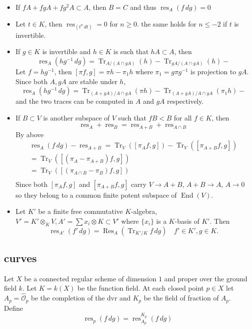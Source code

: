 \documentclass[leqno]{amsart}
\DeclareMathOperator{\Tr}{Tr}
\DeclareMathOperator{\mtr}{Tr}
\newcommand{\oo}{\mathcal O}
\newcommand{\1}{\mathbf{1}}
\DeclareMathOperator{\End}{End}
\DeclareMathOperator{\Res}{Res}
\DeclareMathOperator{\res}{res}
\theoremstyle{definition}
\theoremstyle{remark}
\begin{document}
\begin{itemize}
	\item 
	 If $fA+fgA+fg^2A\subset A$,
	 then  $B=C$ and
	 thus  $\res_A(f\,dg)=0$
 \item Let $t\in K$, then  $\res_(t^n\,dt)=0$
	 for  $n\geq 0$.
	 the same holds for  $n\leq -2$
	 if  $t$ is invertible.
 \item If  $g\in K$ is invertible and  $h\in K$
	 is such that  $hA\subset A$, then
	  \[
		  \res_A(hg^{-1}\,dg)=
		  \mtr_{A/(A\cap gA)}(h)-
		  \mtr_{gA/(A\cap gA)}(h)-
	 \]
	 Let $f=hg^{-1}$, then
	 $[\pi f, g]=\pi h-\pi_1h$ 
	 where $\pi_1=g\pi g^{-1}$ is projection to  $gA$.
	 Since  both $A,gA$ are stable under  $h$,
	  \[
		  \res_A(hg^{-1}\,dg)=
		  \mtr_{(A+gA)/A\cap gA}(\pi h)-
		  \mtr_{(A+gA)/A\cap gA}(\pi_1 h)-
	 \]
	 and the two traces can be computed in $A$ and  $gA$
	 respectively.
 \item If $B\subset V$ is another subspace of  $V$
	 such that  $fB<B$ for all  $f\in K$, then
	  \[
	  	\res_A+\res_B=\res_{A+B}+\res_{A\cap B}
	  \]
	  By above
	  \begin{multline*}
		  \res_A(f\,dg)-\res_{A+B}
		  =\mtr_V([\pi_Af,g])-\mtr_V([\pi_{A+B}f,g])\\
		  =\mtr_V([(\pi_A-\pi_{A+B})f,g])\\
		  =\mtr_V([(\pi_{A\cap B}-\pi_{B})f,g])\\
	  \end{multline*}
	  Since both $[\pi_Af,g]$ and $[\pi_{A+B}f,g]$
	  carry  $V\to A+B$,  $A+B\to A$,  $A\to 0$
	  so they belong to a common finite potent subspace
	  of  $\End(V)$.
  \item Let  $K'$ be a finite free commutative  $K$-algebra,
	   $V'=K'\otimes_KV, A'=\sum x_i\otimes K\subset V'$
	   where  $\{x_i\}$ is a $K$-basis of  $K'$.
	   Then 
	    \[
		    \res_{A'}(f'\,dg)=\Res_A(\Tr_{K'/K}f\,dg)
		    \quad f'\in K', g\in K.
	   \]
\end{itemize}

\subsection{curves}

Let $X$ be a connected regular scheme 
of dimension $1$ and proper over the ground field $k$.
Let $K=k(X)$ be the function field.
At each closed point  $p\in X$
let  $A_p=\hat{\oo}_p$ be the completion of the dvr
and $K_p$ be the field of fraction of  $A_p$.
Define 
 \[
	 \res_p(f\,dg)=\res_{A_p}^{K_p}(f\,dg)
\]
\end{document}
